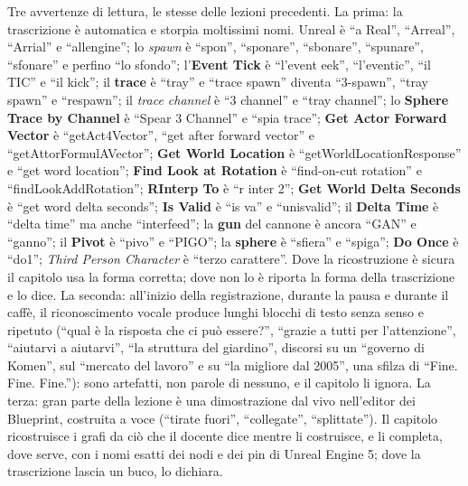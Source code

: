 Tre avvertenze di lettura, le stesse delle lezioni precedenti. La prima: la
trascrizione è automatica e storpia moltissimi nomi. Unreal è ``a Real'', ``Arreal'',
``Arrial'' e ``allengine''; lo \emph{spawn} è ``spon'', ``sponare'', ``sbonare'',
``spunare'', ``sfonare'' e perfino ``lo sfondo''; l'\textbf{Event Tick} è ``l'event
eek'', ``l'eventic'', ``il TIC'' e ``il kick''; il \textbf{trace} è ``tray'' e
``trace spawn'' diventa ``3-spawn'', ``tray spawn'' e ``respawn''; il \emph{trace
channel} è ``3 channel'' e ``tray channel''; lo \textbf{Sphere Trace by Channel} è
``Spear 3 Channel'' e ``spia trace''; \textbf{Get Actor Forward Vector} è
``getAct4Vector'', ``get after forward vector'' e ``getAttorFormulAVector'';
\textbf{Get World Location} è ``getWorldLocationResponse'' e ``get word location'';
\textbf{Find Look at Rotation} è ``find-on-cut rotation'' e ``findLookAddRotation'';
\textbf{RInterp To} è ``r inter 2''; \textbf{Get World Delta Seconds} è ``get word delta
seconds''; \textbf{Is Valid} è ``is va'' e ``unisvalid''; il \textbf{Delta Time} è
``delta time'' ma anche ``interfeed''; la \textbf{gun} del cannone è ancora ``GAN'' e
``ganno''; il \textbf{Pivot} è ``pivo'' e ``PIGO''; la \textbf{sphere} è ``sfiera'' e
``spiga''; \textbf{Do Once} è ``do1''; \emph{Third Person Character} è ``terzo
carattere''. Dove la ricostruzione è sicura il capitolo usa la forma corretta; dove non
lo è riporta la forma della trascrizione e lo dice. La seconda: all'inizio della
registrazione, durante la pausa e durante il caffè, il riconoscimento vocale produce
lunghi blocchi di testo senza senso e ripetuto (``qual è la risposta che ci può
essere?'', ``grazie a tutti per l'attenzione'', ``aiutarvi a aiutarvi'', ``la struttura
del giardino'', discorsi su un ``governo di Komen'', sul ``mercato del lavoro'' e su
``la migliore dal 2005'', una sfilza di ``Fine. Fine. Fine.''): sono artefatti, non
parole di nessuno, e il capitolo li ignora. La terza: gran parte della lezione è una
dimostrazione dal vivo nell'editor dei Blueprint, costruita a voce (``tirate fuori'',
``collegate'', ``splittate''). Il capitolo ricostruisce i grafi da ciò che il docente
dice mentre li costruisce, e li completa, dove serve, con i nomi esatti dei nodi e dei
pin di Unreal Engine 5; dove la trascrizione lascia un buco, lo dichiara.

